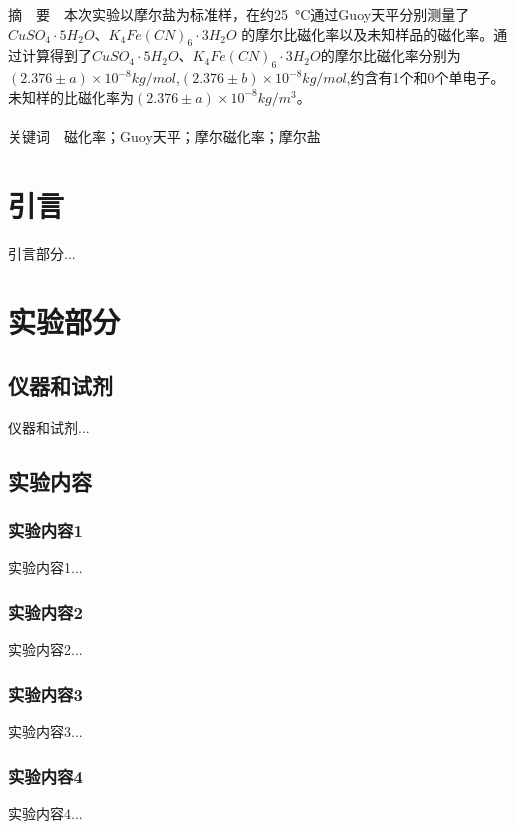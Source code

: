 \documentclass[12pt]{article}
\begin{document}
\begin{titlepage}
\begin{center}
\begin{tabular*}{\textwidth}{c}
                \\ %
                \hline %
            \end{tabular*}
        \end{center}
        \textsf{\textcolor{BrickRed}{摘\ \ 要}}\ \ 本次实验以摩尔盐为标准样，在约\qty{25}{\degreeCelsius}通过Guoy天平分别测量了$CuSO_{4}·5H_{2}O$、$K_{4}Fe(CN)_{6}·3H_{2}O$
		的摩尔比磁化率以及未知样品的磁化率。通过计算得到了$CuSO_{4}·5H_{2}O$、$K_{4}Fe(CN)_{6}·3H_{2}O$的摩尔比磁化率分别为$(2.376\pm a)\times 10^{-8} kg/mol$,$(2.376\pm b)\times 10^{-8} kg/mol$,约含有1个和0个单电子。
		未知样的比磁化率为$(2.376\pm a)\times 10^{-8} kg/m^{3}$。
        \\
        \\
        \textsf{\textcolor{BrickRed}{关键词}}\ \ 磁化率；Guoy天平；摩尔磁化率；摩尔盐
    \end{titlepage}

    \section{引言}
	引言部分...
               
	\vbox{} %
	     
    \section{实验部分}
    	\subsection{仪器和试剂}
    		仪器和试剂...
    			
    	 \subsection{实验内容}
			\subsubsection{实验内容1}
				实验内容1...
			\subsubsection{实验内容2}
				实验内容2...
			\subsubsection{实验内容3}
				实验内容3...
			\subsubsection{实验内容4}
				实验内容4...
\end{document}
